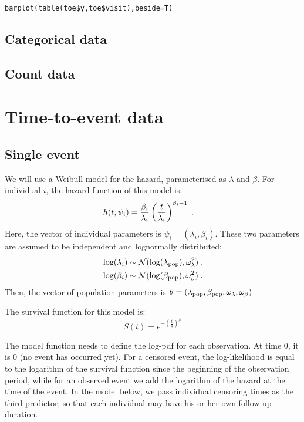 {\begin{verbatim}
barplot(table(toe$y,toe$visit),beside=T)
\end{verbatim}



\subsection{Categorical data} \label{sec:kneeCat}

\subsection{Count data} \label{sec:epilepsyCount}

\section{Time-to-event data}

\subsection{Single event} \label{sec:lungtte}

We will use a Weibull model for the hazard, parameterised as $\lambda$ and $\beta$. For individual $i$, the hazard function of this model is:
\begin{align}\label{weibullmodel}
& h(t, \psi_i) = \frac{\beta_i}{\lambda_i}\left(\frac{t}{\lambda_i}\right)^{\beta_i-1}\;.
\end{align}
Here, the vector of individual parameters is $\psi_i = (\lambda_i, \beta_i)$. These two parameters are assumed to be independent and  lognormally distributed:
\begin{align} \label{indivtte}
& \log(\lambda_i) \sim \mathcal{N}(\log(\lambda_{\rm pop}), \omega^2_{\lambda})\;,\\
& \log(\beta_i) \sim \mathcal{N}(\log(\beta_{\rm pop}), \omega^2_{\beta})\;.
\end{align}
Then, the vector of population parameters is $\theta = (\lambda_{\rm pop}, \beta_{\rm pop}, \omega_{\lambda}, \omega_{\beta})$.

The survival function for this model is:
$$ S(t) = e^{ - \left( \frac{t}{\lambda} \right) ^{\beta}}$$

The model function needs to define the log-pdf for each observation. At time 0, it is 0 (no event has occurred yet). For a censored event, the log-likelihood is equal to the logarithm of the survival function since the beginning of the observation period, while for an observed event we add the logarithm of the hazard at the time of the event. In the model below, we pass individual censoring times as the third predictor, so that each individual may have his or her own follow-up duration.

}
